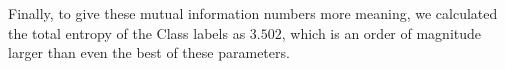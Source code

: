 \documentclass[fleqn]{article}
\begin{document}
Finally, to give these mutual information numbers more meaning, we calculated the total entropy of the Class labels as $3.502$, which is an order of magnitude larger than even the best of these parameters.
%
%
%
\end{document}
